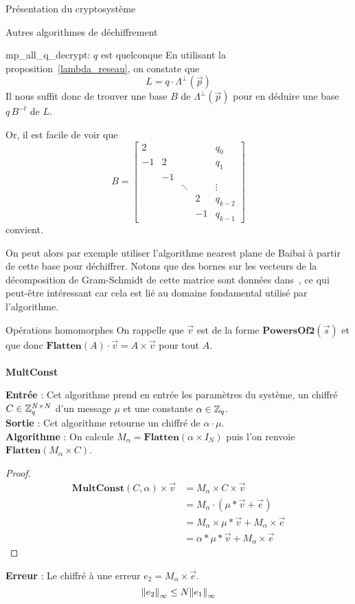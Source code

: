 \begin{section}{Présentation du cryptosystème}
\begin{subsection}{Autres algorithmes de déchiffrement}
\begin{subsubsection}{mp\_all\_q\_decrypt: $q$ est quelconque}
En utilisant la proposition~\ref{lambda_reseau}, on constate que
\[ L = q \cdot \Lambda^\bot\left(\vec{p}\right) \]
Il nous suffit donc de trouver une base $B$ de $\Lambda^\bot\left(\vec{p}\right)$
pour en déduire une base $q \, B^{-t}$ de $L$.

Or, il est facile de voir que  
\[ B = \begin{bmatrix} 
	2 & &&& q_0\\  
	-1 & 2 &&& q_1\\
   & -1 \\ 
	&    & \ddots & & \vdots \\
	&    &       &  2 & q_{k-2} \\
	&    &       &  -1 & q_{k-1}
\end{bmatrix}\]
convient.

On peut alors par exemple utiliser l'algorithme nearest plane de Baibai 
à partir de cette base pour déchiffrer. Notons que des bornes sur 
les vecteurs de la décomposition de Gram-Schmidt de cette matrice sont données
dans~\cite{EC:MicPei12}, ce qui peut-être intéressant car cela est lié 
au domaine fondamental utilisé par l'algorithme.

\end{subsubsection}

	
\end{subsection}
	\begin{subsection}{Opérations homomorphes}
	On rappelle que $\vec{v}$ est de la forme $\textbf{PowersOf2}(\vec{s})$ et que donc $\textbf{Flatten}(A) \cdot \vec{v} = A \times \vec{v}$ pour tout $A$.
	
	\paragraph{}
	\textbf{MultConst}
	\flushleft
	
	\textbf{Entrée} : Cet algorithme prend en entrée les paramètres du système, un chiffré $C \in \mathbb{Z}_q^{N \times N}$ d'un message $\mu$ et une constante $\alpha \in \mathbb{Z}_q$. \\
	\textbf{Sortie} : Cet algorithme retourne un chiffré de $\alpha \cdot \mu$.\\
	\textbf{Algorithme} : On calcule $M_{\alpha} = \textbf{Flatten}(\alpha \times I_N)$ puis l'on renvoie $\textbf{Flatten}(M_{\alpha} \times C)$.
	\begin{proof}
	\begin{align*}
	\textbf{MultConst}(C, \alpha) \times \vec{v} &= M_{\alpha} \times C \times \vec{v} \\
	&= M_{\alpha} \cdot (\mu * \vec{v} + \vec{e}) \\
	&= M_{\alpha} \times \mu * \vec{v} + M_{\alpha} \times \vec{e} \\
	&= \alpha * \mu * \vec{v} + M_{\alpha} \times \vec{e}
	\end{align*}
	\end{proof}
	\textbf{Erreur} : Le chiffré à une erreur $e_2 = M_\alpha \times
		\vec{e}$. 
		\[{\|e_2\|}_{\infty} \leq N {\|e_1\|}_{\infty}\]

\end{subsection}
\end{section}
